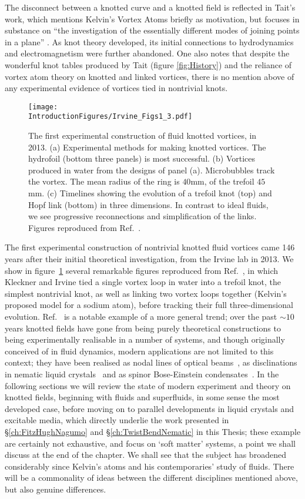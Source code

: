 The disconnect between a knotted curve and a knotted field is reflected in Tait's work, which mentions Kelvin's Vortex Atoms briefly as motivation, but focuses in substance on ``the investigation of the essentially different modes of joining points in a plane'' \citep{Tait1}. As knot theory developed, its initial connections to hydrodynamics and electromagnetism were further abandoned. One also notes that despite the wonderful knot tables produced by Tait (figure \ref{fig:History}) and the reliance of vortex atom theory on knotted and linked vortices, there is no mention above of any experimental evidence of vortices tied in nontrivial knots. 
\begin{figure}[htbp]
\centering
\texttt{[image: \\IntroductionFigures/Irvine\_Figs1\_3.pdf]}
\caption{The first experimental construction of fluid knotted vortices, in 2013. (a) Experimental methods for making knotted vortices. The hydrofoil (bottom three panels) is most successful. (b) Vortices produced in water from the designs of panel (a). Microbubbles track the vortex. The mean radius of the ring is $40$mm, of the trefoil $45$mm. (c) Timelines showing the evolution of a trefoil knot (top) and Hopf link (bottom) in three dimensions. In contrast to ideal fluids, we see progressive reconnections and simplification of the links. Figures reproduced from Ref.~\citep{Kleckner2013}.}
\label{fig:Irvine}
\end{figure}

The first experimental construction of nontrivial knotted fluid vortices came 146 years after their initial theoretical investigation, from the Irvine lab in 2013. We show in figure~\ref{fig:Irvine} several remarkable figures reproduced from Ref.~\citep{Kleckner2013}, in which Kleckner and Irvine tied a single vortex loop in water into a trefoil knot, the simplest nontrivial knot, as well as linking two vortex loops together (Kelvin's proposed model for a sodium atom), before tracking their full three-dimensional evolution. Ref.~\citep{Kleckner2013} is a notable example of a more general trend; over the past $\sim10$ years knotted fields have gone from being purely theoretical constructions to being experimentally realisable in a number of systems, and though originally conceived of in fluid dynamics, modern applications are not limited to this context; they have been realised as nodal lines of optical beams~\citep{Dennis2010}, as disclinations in nematic liquid crystals~\citep{Tkalec2011,Tasinkevych2014,Copar2015} and as spinor Bose-Einstein condensates~\citep{Hall2016}. In the following sections we will review the state of modern experiment and theory on knotted fields, beginning with fluids and superfluids, in some sense the most developed case, before moving on to parallel developments in liquid crystals and excitable media, which directly underlie the work presented in \S \ref{ch:FitzHughNagumo} and \S \ref{ch:TwistBendNematic} in this Thesis; these example are certainly not exhaustive, and focus on `soft matter' systems, a point we shall discuss at the end of the chapter. We shall see that the subject has broadened considerably since Kelvin's atoms and his contemporaries' study of fluids. There will be a commonality of ideas between the different disciplines mentioned above, but also genuine differences.
